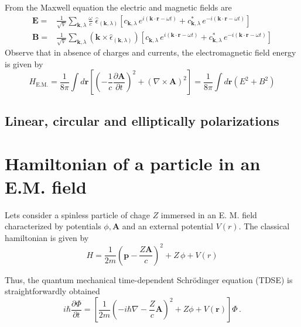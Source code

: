 From the Maxwell equation the electric and magnetic fields are
\begin{subequations}
  \begin{align}\label{Q:Elect-Magne-field}
    \bm{E} =& \frac{1}{\sqrt{V}}\sum_{\bm{k},\lambda}\frac{\omega}{c} \; \hat{\epsilon}_{(\bm{k},\lambda)} \left[ c_{\bm{k},\lambda} \,e^{i (\bm{k} \cdot \bm{r} - \omega t)} + c^{*}_{\bm{k},\lambda} \, e^{- i (\bm{k} \cdot \bm{r} - \omega t) } \right]
    \\
    \bm{B} =& \frac{1}{\sqrt{V}}\sum_{\bm{k},\lambda} \left(\bm{k} {\times} \hat{\epsilon}_{(\bm{k},\lambda)} \right) \left[ c_{\bm{k},\lambda} \, e^{i (\bm{k} \cdot \bm{r} - \omega t)} + c^{*}_{\bm{k},\lambda} \, e^{- i (\bm{k} \cdot \bm{r} - \omega t) } \right]
  \end{align}

\end{subequations}
Observe that in absence of charges and currents, the electromagnetic field energy is given by
\begin{equation}\label{Q:Energ-EM-free}
H_{\mathrm{E.M.}} = \frac{1}{8 \pi} \int d \bm{r} \left[ \left(
-\frac{1}{c} \frac{\partial \bm{A}}{\partial t}\right)^{2} + \left(
\nabla {\times} \bm{A} \right)^{2} \right] = \frac{1}{8 \pi} \int d \bm{r}
\left( E^{2} + B^{2} \right)
\end{equation}


\subsection{Linear, circular and elliptically polarizations}

\section{Hamiltonian of a particle in an E.M. field}

Lets consider a spinless particle of chage $Z$ immersed in an E. M.  field characterized by potentials $\phi, \bm{A}$ and an external potential $V(r)$. The classical hamiltonian is given by \textcite[][App.~E]{Townsen2000_AMA}
\begin{equation}\label{Q:Clas-Hamil-EM}
H = \frac{1}{2 m} \left( \bm{p} - \frac{Z \bm{A}}{c} \right)^{2} + Z \, \phi + V(r)
\end{equation}
%

Thus, the quantum mechanical time-dependent Schr\"{o}dinger equation (TDSE) is straightforwardly obtained
\begin{equation}\label{Q:QM-Hamil-EM}
i \hbar \frac{\partial \Phi}{\partial t} = \left[ \frac{1}{2 m} \left( - i \hbar \nabla - \frac{Z}{c}\bm{A} \right)^{2} + Z \phi + V(\bm{r})\right] \Phi \,.
\end{equation}


